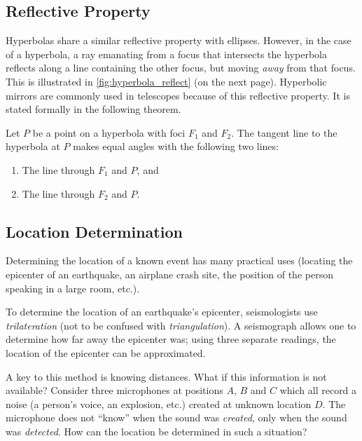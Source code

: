 {\subsection{Reflective Property}

Hyperbolas share a similar reflective property with ellipses. However, in the case of a hyperbola, a ray emanating from a focus that intersects the hyperbola reflects along a line containing the other focus, but moving \emph{away} from that focus. This is illustrated in \autoref{fig:hyperbola_reflect} (on the next page). Hyperbolic mirrors are commonly used in telescopes because of this reflective property. It is stated formally in the following theorem.

\begin{theorem}\label{thm:reflective_hyperbola}%
Let $P$ be a point on a hyperbola with foci $F_1$ and $F_2$. The tangent line to the hyperbola at $P$ makes equal angles with the following two lines:
\begin{enumerate}
	\item	The line through $F_1$ and $P$, and
	\item	The line through $F_2$ and $P$.
\end{enumerate}
\end{theorem}

\subsection{Location Determination}

Determining the location of a known event has many practical uses (locating the epicenter of an earthquake, an airplane crash site, the position of the person speaking in a large room, etc.).

To determine the location of an earthquake's epicenter, seismologists use \emph{trilateration} (not to be confused with \emph{triangulation}). A seismograph allows one to determine how far away the epicenter was; using three separate readings, the location of the epicenter can be approximated.

A key to this method is knowing distances. What if this information is not available? Consider three microphones at positions $A$, $B$ and $C$ which all record a noise (a person's voice, an explosion, etc.) created at unknown location $D$. The microphone does not ``know'' when the sound was \emph{created}, only when the sound was \emph{detected}. How can the location be determined in such a situation?

}
